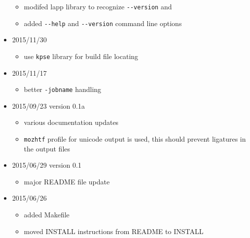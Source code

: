 \begin{itemize}
  \begin{itemize}
  \tightlist
  \item
    modifed lapp library to recognize \texttt{-\/-version} and
  \item
    added \texttt{-\/-help} and \texttt{-\/-version} command line
    options
  \end{itemize}
\item
  2015/11/30

  \begin{itemize}
  \tightlist
  \item
    use \texttt{kpse} library for build file locating
  \end{itemize}
\item
  2015/11/17

  \begin{itemize}
  \tightlist
  \item
    better \texttt{-jobname} handling
  \end{itemize}
\item
  2015/09/23 version 0.1a

  \begin{itemize}
  \tightlist
  \item
    various documentation updates
  \item
    \texttt{mozhtf} profile for unicode output is used, this should
    prevent ligatures in the output files
  \end{itemize}
\item
  2015/06/29 version 0.1

  \begin{itemize}
  \tightlist
  \item
    major README file update
  \end{itemize}
\item
  2015/06/26

  \begin{itemize}
  \tightlist
  \item
    added Makefile
  \item
    moved INSTALL instructions from README to INSTALL
  \end{itemize}
\end{itemize}
